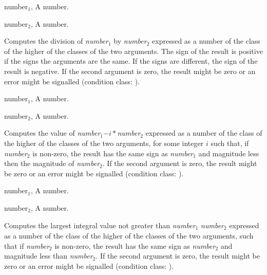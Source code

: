 \begin{optDefinition}
%
\begin{genericargs}
    \item[number$_1$, \classref{number}] A number.
    \item[number$_2$, \classref{number}] A number.
\end{genericargs}
%
\result%
Computes the division of {\em number$_1$} by {\em number$_2$} expressed as a
number of the class of the higher of the classes of the two arguments.  The sign
of the result is positive if the signs the arguments are the same.  If the signs
are different, the sign of the result is negative.  If the second argument is
zero, the result might be zero or an error might be signalled (condition class:
).

%
\begin{genericargs}
    \item[number$_1$, \classref{number}] A number.
    \item[number$_2$, \classref{number}] A number.
\end{genericargs}
%
\result%
Computes the value of {\em{}number$_1$}$-i*${\em{}number$_2$} expressed as a
number of the class of the higher of the classes of the two arguments, for some
integer $i$ such that, if {\em number$_2$} is non-zero, the result has the same
sign as {\em number$_1$} and magnitude less then the magnitude of {\em
    number$_2$}.  If the second argument is zero, the result might be zero or an
error might be signalled (condition class:
).

%
\begin{genericargs}
    \item[number$_1$, \classref{number}] A number.
    \item[number$_2$, \classref{number}] A number.
\end{genericargs}
%
\result%
Computes the largest integral value not greater than {\em
    number$_1$}$\over${\em{}number$_2$} expressed as a number of the class of
the higher of the classes of the two arguments, such that if {\em number$_2$} is
non-zero, the result has the same sign as {\em number$_2$} and magnitude less
than {\em number$_2$}.  If the second argument is zero, the result might be zero
or an error might be signalled (condition class:
).


\end{optDefinition}
